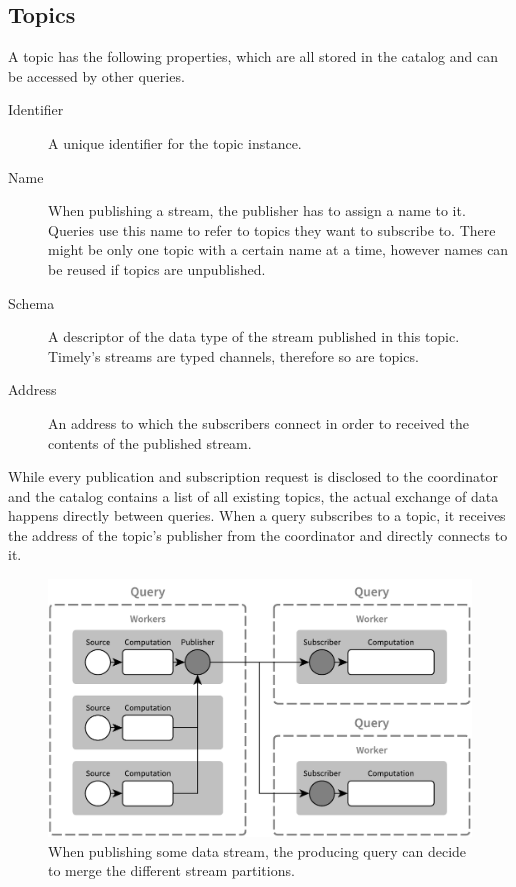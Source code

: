 \subsection{Topics}

A topic has the following properties, which are all stored in the catalog
and can be accessed by other queries.
\begin{description}
\item [Identifier] A unique identifier for the topic instance.
\item [Name] When publishing a stream, the publisher has to assign a name to it.
Queries use this name to refer to topics they want to subscribe to. There might
be only one topic with a certain name at a time, however names can be reused if
topics are unpublished.
\item [Schema] A descriptor of the data type of the stream published in this
topic. Timely's streams are typed channels, therefore so are topics.
\item [Address] An address to which the subscribers connect in order to received
the contents of the published stream.
\end{description}

While every publication and subscription request is disclosed to the coordinator
and the catalog contains a list of all existing topics, the
actual exchange of data happens directly between queries. When a query subscribes
to a topic, it receives the address of the topic's publisher from the coordinator
and directly connects to it.

\begin{figure}[htb]
  \centering
    \includegraphics[width=1\textwidth]{figures/pubsub}
  \caption[Publisher and subscribers]{
  When publishing some data stream, the producing query can decide
  to merge the different stream partitions.}
  \label{fig:pubsubfig}
\end{figure}

